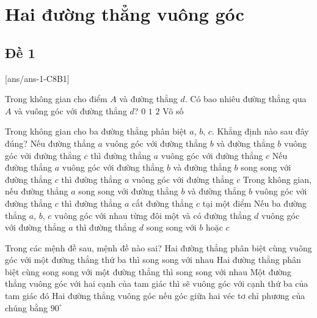 \section{Hai đường thẳng vuông góc}

\subsection{Đề 1}
[ans/ans-1-C8B1]
\caulc

\begin{ex}%
Trong không gian cho điểm $A$ và đường thẳng $d$. Có bao nhiêu đường thẳng qua $A$ và vuông góc với đường thẳng $d$?
	\choice
		{$0$}
		{$1$}
		{$2$}
		{\True Vô số}
\end{ex}

\begin{ex}%
Trong không gian cho ba đường thẳng phân biệt $a$, $b$, $c$. Khẳng định nào sau đây đúng?
	\choice
		{Nếu đường thẳng $a$ vuông góc với đường thẳng $b$ và đường thẳng $b$ vuông góc với đường thẳng $c$ thì đường thẳng $a$ vuông góc với đường thẳng $c$}
		{\True Nếu đường thẳng $a$ vuông góc với đường thẳng $b$ và đường thẳng $b$ song song với đường thẳng $c$ thì đường thẳng $a$ vuông góc với đường thẳng $c$}
		{Trong không gian, nếu đường thẳng $a$ song song với đường thẳng $b$ và đường thẳng $b$ vuông góc với đường thẳng $c$ thì đường thẳng $a$ cắt đường thẳng $c$ tại một điểm}
		{Nếu ba đường thẳng $a$, $b$, $c$ vuông góc với nhau từng đôi một và có đường thẳng $d$ vuông góc với đường thẳng $a$ thì đường thẳng $d$ song song với $b$ hoặc $c$}
\end{ex}

\begin{ex}%
Trong các mệnh đề sau, mệnh đề nào sai?
	\choice
		{\True Hai đường thẳng phân biệt cùng vuông góc với một đường thẳng thứ ba thì song song với nhau}
		{Hai đường thẳng phân biệt cùng song song với một đường thẳng thì song song với nhau}
		{Một đường thẳng vuông góc với hai cạnh của tam giác thì sẽ vuông góc với cạnh thứ ba của tam giác đó}
		{Hai đường thẳng vuông góc nếu góc giữa hai véc tơ chỉ phương của chúng bằng $90^\circ$}
\end{ex}

